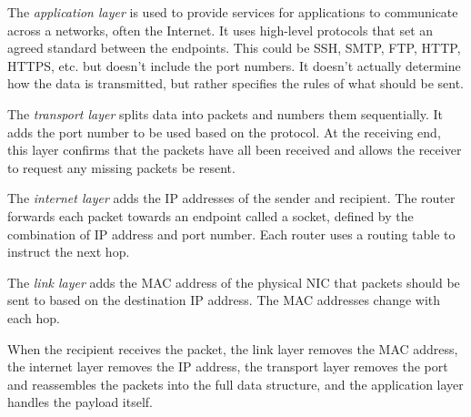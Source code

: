 \documentclass[../main.tex]{subfile}
\begin{document}
The \textit{application layer} is used to provide services for applications to communicate across a networks, often the Internet. It uses high-level protocols that set an agreed standard between the endpoints. This could be SSH, SMTP, FTP, HTTP, HTTPS, etc. but doesn't include the port numbers. It doesn't actually determine how the data is transmitted, but rather specifies the rules of what should be sent.

The \textit{transport layer} splits data into packets and numbers them sequentially. It adds the port number to be used based on the protocol. At the receiving end, this layer confirms that the packets have all been received and allows the receiver to request any missing packets be resent.

The \textit{internet layer} adds the IP addresses of the sender and recipient. The router forwards each packet towards an endpoint called a socket, defined by the combination of IP address and port number. Each router uses a routing table to instruct the next hop.

The \textit{link layer} adds the MAC address of the physical NIC that packets should be sent to based on the destination IP address. The MAC addresses change with each hop.

When the recipient receives the packet, the link layer removes the MAC address, the internet layer removes the IP address, the transport layer removes the port and reassembles the packets into the full data structure, and the application layer handles the payload itself.
\end{document}
